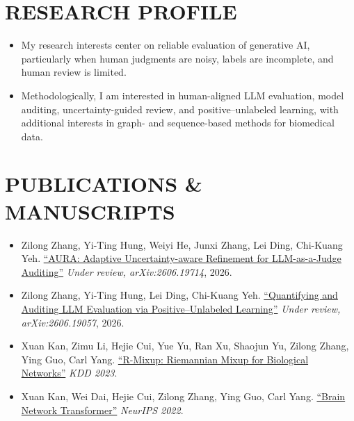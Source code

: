 \documentclass[letterpaper,11pt]{article}
\newcommand{\resumeItem}[1]{
  \item\small{
    {#1 \vspace{-2pt}}
  }
}
\newcommand{\resumeItemListStart}{\begin{itemize}}
\newcommand{\resumeItemListEnd}{\end{itemize}\vspace{-3pt}}
\begin{document}
\section{RESEARCH PROFILE}
\resumeItemListStart
  \resumeItem{My research interests center on reliable evaluation of generative AI, particularly when human judgments are noisy, labels are incomplete, and human review is limited.}
  \resumeItem{Methodologically, I am interested in human-aligned LLM evaluation, model auditing, uncertainty-guided review, and positive--unlabeled learning, with additional interests in graph- and sequence-based methods for biomedical data.}
\resumeItemListEnd
\vspace{-10pt}

\section{PUBLICATIONS \& MANUSCRIPTS}
\resumeItemListStart
    \resumeItem{
        Zilong Zhang, Yi-Ting Hung, Weiyi He, Junxi Zhang, Lei Ding, Chi-Kuang Yeh.
        \href{https://arxiv.org/abs/2606.19714}
        {``AURA: Adaptive Uncertainty-aware Refinement for LLM-as-a-Judge Auditing''}
        \textit{Under review, arXiv:2606.19714}, 2026.
    }

    \resumeItem{
        Zilong Zhang, Yi-Ting Hung, Lei Ding, Chi-Kuang Yeh.
    \href{https://arxiv.org/abs/2606.19057}
        {``Quantifying and Auditing LLM Evaluation via Positive--Unlabeled Learning''}
        \textit{Under review, arXiv:2606.19057}, 2026.
    }
    \resumeItem{Xuan Kan, Zimu Li, Hejie Cui, Yue Yu, Ran Xu, Shaojun Yu, Zilong Zhang, Ying Guo, Carl Yang.
        \href{https://dl.acm.org/doi/10.1145/3580305.3599483}{``R-Mixup: Riemannian Mixup for Biological Networks''}
        \textit{KDD 2023}.}
    \resumeItem{Xuan Kan, Wei Dai, Hejie Cui, Zilong Zhang, Ying Guo, Carl Yang.
        \href{https://proceedings.neurips.cc/paper_files/paper/2022/file/a408234a9b80604a9cf6ca518e474550-Paper-Conference.pdf}{``Brain Network Transformer''}
        \textit{NeurIPS 2022}.}
\resumeItemListEnd
\vspace{-10pt}

\end{document}
